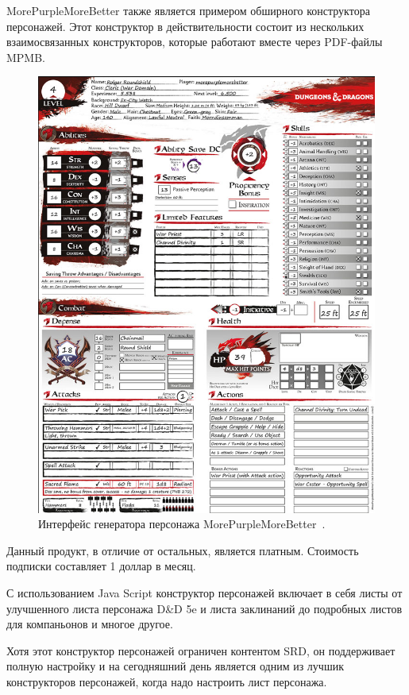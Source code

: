 MorePurpleMoreBetter также является примером обширного конструктора персонажей. Этот конструктор в действительности состоит из нескольких взаимосвязанных конструкторов, которые работают вместе через PDF-файлы MPMB.

\begin{figure}[H]
    \centering
    \includegraphics[scale=0.5]{MPMB.png}
    \caption{Интерфейс генератора персонажа MorePurpleMoreBetter~\cite{mpmb}.}
    \label{fig:mpmb}
\end{figure}

Данный продукт, в отличие от остальных, является платным. Стоимость подписки составляет 1 доллар в месяц.

С использованием Java Script конструктор персонажей включает в себя листы от улучшенного листа персонажа D\&D 5e и листа  заклинаний до подробных листов для компаньонов и многое другое.

Хотя этот конструктор персонажей ограничен контентом SRD, он поддерживает полную настройку и на сегодняшний день является одним из лучшик конструкторов персонажей, когда надо настроить лист персонажа.

